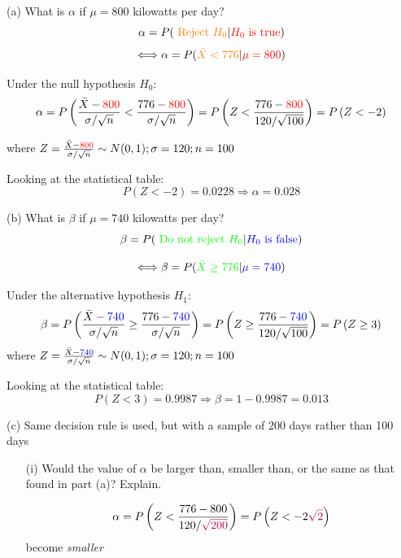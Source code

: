 \documentclass[
  10pt,
  ignorenonframetext,
]{beamer}
\begin{document}
\begin{frame}{(a) What is \(\alpha\) if \(\mu = 800\) kilowatts per
day?}
\protect\hypertarget{a-what-is-alpha-if-mu-800-kilowatts-per-day}{}
\[
\alpha = P(\textcolor{orange}{\text{ Reject } H_0} | \textcolor{red}{H_0 \text{ is true}})
\] \[
\Longleftrightarrow \alpha = P(\textcolor{orange}{\bar{X} < 776} | \textcolor{red}{\mu = 800})
\]

Under the null hypothesis \(H_0\): \[
\alpha = P\left(\frac{\bar{X}-\textcolor{red}{800}}{\sigma/\sqrt{n}} < \frac{776-\textcolor{red}{800}}{\sigma/\sqrt{n}}\right) = P\left(Z < \frac{776-\textcolor{red}{800}}{120/\sqrt{100}}\right) = P\left(Z < -2\right)
\]

where
\(Z = \frac{\bar{X}-\textcolor{red}{800}}{\sigma/\sqrt{n}} \sim N(0,1); \sigma = 120; n =100\)

\vspace{3mm}
\pause

Looking at the statistical table: \[
P\left(Z < -2\right) = 0.0228 \Longrightarrow \alpha = 0.028
\]
\end{frame}

\begin{frame}{(b) What is \(\beta\) if \(\mu = 740\) kilowatts per day?}
\protect\hypertarget{b-what-is-beta-if-mu-740-kilowatts-per-day}{}
\[
\beta = P(\textcolor{green}{\text{ Do not reject } H_0} | \textcolor{blue}{H_0 \text{ is false}})
\]

\[
\Longleftrightarrow \beta = P(\textcolor{green}{\bar{X} \geq 776} | \textcolor{blue}{\mu = 740})
\]

Under the alternative hypothesis \(H_1\): \[
\beta = P\left(\frac{\bar{X}-\textcolor{blue}{740}}{\sigma/\sqrt{n}} \geq \frac{776-\textcolor{blue}{740}}{\sigma/\sqrt{n}}\right) = P\left(Z \geq \frac{776-\textcolor{blue}{740}}{120/\sqrt{100}}\right) = P\left(Z \geq 3\right)
\] where
\(Z = \frac{\bar{X}-\textcolor{blue}{740}}{\sigma/\sqrt{n}} \sim N(0,1); \sigma = 120; n =100\)

\vspace{3mm}
\pause

Looking at the statistical table: \[
P\left(Z < 3\right) = 0.9987 \Longrightarrow \beta = 1-0.9987 = 0.013
\]
\end{frame}

\begin{frame}{(c) Same decision rule is used, but with a sample of 200
days rather than 100 days}
\protect\hypertarget{c-same-decision-rule-is-used-but-with-a-sample-of-200-days-rather-than-100-days}{}
\begin{enumerate}
        \item [(i)] Would the value of $\alpha$ be larger than, smaller than, or the same as that found in part (a)? Explain.
        
\pause 
\vspace{3mm}

$$
        \alpha = P\left(Z < \frac{776-800}{120/\textcolor{purple}{\sqrt{200}}}\right) = P\left(Z < -2{\textcolor{purple}{\sqrt{2}}}\right)
$$
become \textit{smaller}
\end{enumerate}
\end{frame}
\end{document}
